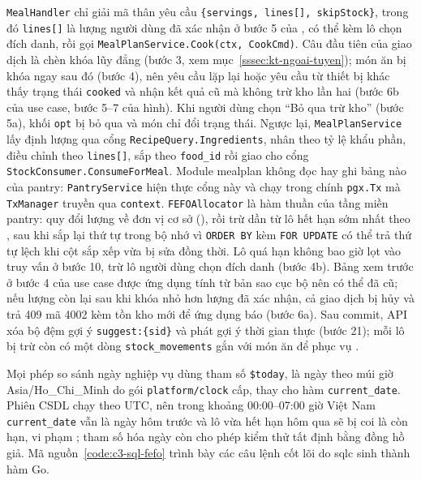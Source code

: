 \texttt{MealHandler} chỉ giải mã thân yêu cầu \texttt{\{servings, lines[], skipStock\}}, trong đó \texttt{lines[]} là lượng người dùng đã xác nhận ở bước 5 của , có thể kèm lô chọn đích danh, rồi gọi \texttt{MealPlanService.Cook(ctx, CookCmd)}. Câu đầu tiên của giao dịch là chèn khóa lũy đẳng (bước 3, xem mục~\ref{sssec:kt-ngoai-tuyen}); món ăn bị khóa ngay sau đó (bước 4), nên yêu cầu lặp lại hoặc yêu cầu từ thiết bị khác thấy trạng thái \texttt{cooked} và nhận kết quả cũ mà không trừ kho lần hai (bước 6b của use case, bước 5--7 của hình). Khi người dùng chọn “Bỏ qua trừ kho” (bước 5a), khối \texttt{opt} bị bỏ qua và món chỉ đổi trạng thái. Ngược lại, \texttt{MealPlanService} lấy định lượng qua cổng \texttt{RecipeQuery.Ingredients}, nhân theo tỷ lệ khẩu phần, điều chỉnh theo \texttt{lines[]}, sắp theo \texttt{food\_id} rồi giao cho cổng \texttt{StockConsumer.ConsumeForMeal}. Module mealplan không đọc hay ghi bảng nào của pantry: \texttt{PantryService} hiện thực cổng này và chạy trong chính \texttt{pgx.Tx} mà \texttt{TxManager} truyền qua \texttt{context}. \texttt{FEFOAllocator} là hàm thuần của tầng miền pantry: quy đổi lượng về đơn vị cơ sở (), rồi trừ dần từ lô hết hạn sớm nhất theo , sau khi sắp lại thứ tự trong bộ nhớ vì \texttt{ORDER BY} kèm \texttt{FOR UPDATE} có thể trả thứ tự lệch khi cột sắp xếp vừa bị sửa đồng thời. Lô quá hạn không bao giờ lọt vào truy vấn ở bước 10, trừ lô người dùng chọn đích danh (bước 4b). Bảng xem trước ở bước 4 của use case được ứng dụng tính từ bản sao cục bộ nên có thể đã cũ; nếu lượng còn lại sau khi khóa nhỏ hơn lượng đã xác nhận, cả giao dịch bị hủy và trả 409 mã 4002 kèm tồn kho mới để ứng dụng báo  (bước 6a). Sau commit, API xóa bộ đệm gợi ý \texttt{suggest:\{sid\}} và phát gợi ý thời gian thực (bước 21); mỗi lô bị trừ còn có một dòng \texttt{stock\_movements} gắn với món ăn để phục vụ .

Mọi phép so sánh ngày nghiệp vụ dùng tham số \texttt{\$today}, là ngày theo múi giờ Asia/Ho\_Chi\_Minh do gói \texttt{platform/clock} cấp, thay cho hàm \texttt{current\_date}. Phiên CSDL chạy theo UTC, nên trong khoảng 00:00--07:00 giờ Việt Nam \texttt{current\_date} vẫn là ngày hôm trước và lô vừa hết hạn hôm qua sẽ bị coi là còn hạn, vi phạm ; tham số hóa ngày còn cho phép kiểm thử tất định bằng đồng hồ giả. Mã nguồn~\ref{code:c3-sql-fefo} trình bày các câu lệnh cốt lõi do sqlc sinh thành hàm Go.


